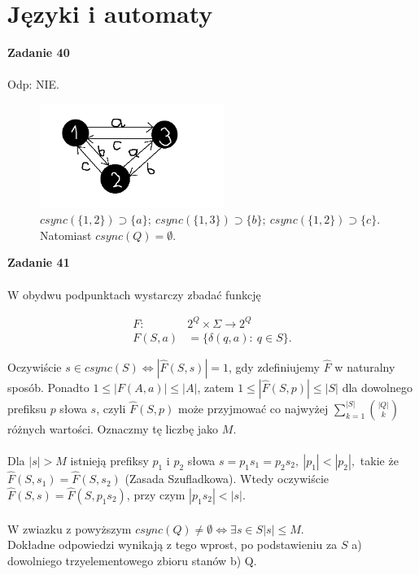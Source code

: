 \documentclass[a4paper,11pt]{article}
\begin{document}
\section{\LARGE{Języki i automaty}}

\textbf{Zadanie 40} \\ \\
Odp: NIE. \\


\begin{figure}[h!]
  \centerline{%
    \includegraphics[width=6cm]{zad40.png}%
  }%
  \caption{$csync(\{1,2\}) \supset \{a\}; \ csync(\{1,3\}) \supset \{b\};\ csync(\{1,2\}) \supset \{c\}$. Natomiast $csync(Q) = \emptyset $.}
\end{figure}


\textbf{Zadanie 41} \\ \\
W obydwu podpunktach wystarczy zbadać funkcję

\begin{align*}
 F :\ &2^Q \times \Sigma \longrightarrow 2^Q \\
 F(S,a) &= \{ \delta(q,a) : \ q \in S \}.
\end{align*}

Oczywiście $s \in csync(S) \Longleftrightarrow |\widehat{F}(S,s)| = 1$, gdy zdefiniujemy $\widehat{F}$ w naturalny sposób. 
Ponadto $1 \leqslant |F(A,a)| \leqslant |A|$, zatem $1 \leqslant |\widehat{F}(S,p)| \leqslant |S|$ dla dowolnego prefiksu $p$ słowa $s$,
czyli $\widehat{F}(S,p)$ może przyjmować co najwyżej $\displaystyle{\sum\limits^{|S|}_{k=1}\binom{|Q|}{k}}$ różnych wartości.
Oznaczmy tę liczbę jako $M$. \\ \\

Dla $|s| > M$ istnieją prefiksy $p_1$ i $p_2$ słowa $s = p_1s_1 = p_2s_2, \ |p_1| < |p_2|,$ takie że 
$\widehat{F}(S,s_1) = \widehat{F}(S,s_2)$ (Zasada Szufladkowa). Wtedy oczywiście $\widehat{F}(S,s) = \widehat{F}(S,p_1s_2)$, przy czym 
$|p_1s_2| < |s|$. \\ \\
W zwiazku z powyższym $csync(Q) \neq \emptyset \Longleftrightarrow \exists s \in S |s| \leqslant M$. \\
Dokładne odpowiedzi wynikają z tego wprost, po podstawieniu za $S$ a) dowolniego trzyelementowego zbioru stanów b) Q. \\ \\
\end{document}
